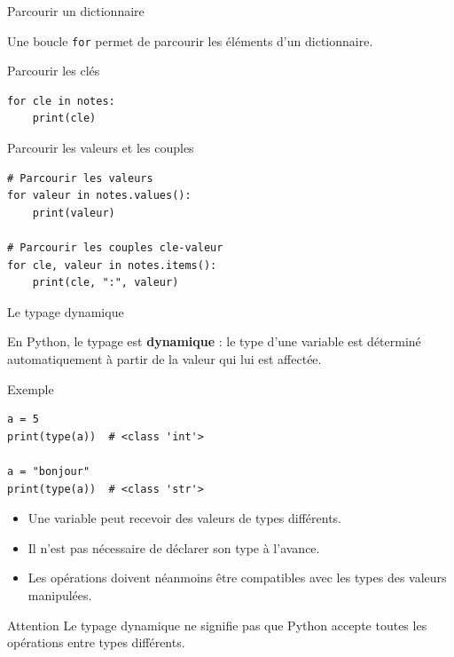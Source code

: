 \documentclass[10pt]{beamer}
\begin{document}
\begin{frame}[fragile]{Parcourir un dictionnaire}

Une boucle \texttt{for} permet de parcourir les éléments
d'un dictionnaire.

\begin{exampleblock}{Parcourir les clés}
\small
\begin{lstlisting}
for cle in notes:
    print(cle)
\end{lstlisting}
\end{exampleblock}

\begin{exampleblock}{Parcourir les valeurs et les couples}
\small
\begin{lstlisting}
# Parcourir les valeurs
for valeur in notes.values():
    print(valeur)

# Parcourir les couples cle-valeur
for cle, valeur in notes.items():
    print(cle, ":", valeur)
\end{lstlisting}
\end{exampleblock}

\end{frame}
\begin{frame}[fragile]{Le typage dynamique}

En Python, le typage est \textbf{dynamique} :
le type d'une variable est déterminé automatiquement
à partir de la valeur qui lui est affectée.

\begin{exampleblock}{Exemple}
\small
\begin{lstlisting}
a = 5
print(type(a))  # <class 'int'>

a = "bonjour"
print(type(a))  # <class 'str'>
\end{lstlisting}
\end{exampleblock}

\begin{itemize}
    \item Une variable peut recevoir des valeurs de types différents.
    \item Il n'est pas nécessaire de déclarer son type à l'avance.
    \item Les opérations doivent néanmoins être compatibles avec
    les types des valeurs manipulées.
\end{itemize}

\begin{alertblock}{Attention}
\small
Le typage dynamique ne signifie pas que Python accepte
toutes les opérations entre types différents.
\end{alertblock}

\end{frame}
\end{document}
